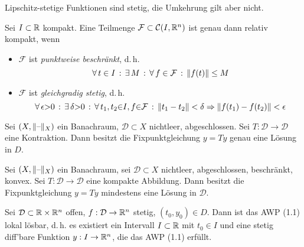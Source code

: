 \documentclass{cheat-sheet}
\newcommand{\D}{\mathcal{D}}
\begin{document}
\begin{bem}
  Lipschitz-stetige Funktionen sind stetig, die Umkehrung gilt aber nicht.
\end{bem}


\begin{satz}
  Sei $I \subset \mathbb{R}$ kompakt. Eine Teilmenge $\mathcal{F} \subset \mathcal{C}(I, \mathbb{R}^n)$ ist genau dann relativ kompakt, wenn
  \begin{itemize}
    \item $\mathcal{F}$ ist \emph{punktweise beschränkt}, d.\,h.
    \[ \forall \, {t \in I} \,:\, \exists \, {M} \,:\, \forall \, {f \in \mathcal{F}} \,:\, \lVert f(t)\rVert \leq M \]
    \item $\mathcal{F}$ ist \emph{gleichgradig stetig}, d.\,h.
    \[ \forall \, {\epsilon {>} 0} \,:\, \exists \, {\delta {>} 0} \,:\, \forall \, {t_1, t_2 {\in} I, f {\in} \mathcal{F}} \,:\, \lVert t_1 - t_2\rVert < \delta \Rightarrow \lVert f(t_1) - f(t_2)\rVert < \epsilon \]
  \end{itemize}
\end{satz}

\begin{satz}
  Sei $(X, \lVert\text{--}\rVert_X)$ ein Banachraum, $\D \subset X$ nichtleer, abgeschlossen. Sei $T : \D \to \D$ eine Kontraktion. Dann besitzt die Fixpunktgleichung $y = Ty$ genau eine Lösung in $D$.
\end{satz}

\begin{satz}
  Sei $(X, \lVert\text{--}\rVert_X)$ ein Banachraum, sei $\D \subset X$ nichtleer, abgeschlossen, beschränkt, konvex. Sei $T : \D \to \D$ eine kompakte Abbildung. Dann besitzt die Fixpunktgleichung $y = Ty$ mindestens eine Lösung in $\D$.
\end{satz}


\begin{satz}
  Sei $\D \subset \R \times \R^n$ offen, $f : \D \to \R^n$ stetig, $(t_0, y_0) \in D$. Dann ist das AWP (1.1) lokal lösbar, d.\,h. es existiert ein Intervall $I \subset \mathbb{R}$ mit $t_0 \in I$ und eine stetig diff'bare Funktion $y : I \to \mathbb{R}^n$, die das AWP (1.1) erfüllt.
\end{satz}


\end{document}
